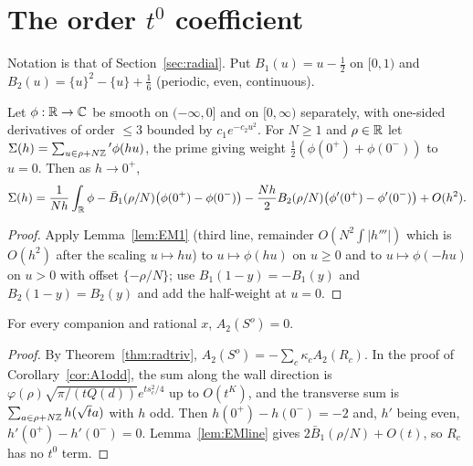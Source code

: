 \section{The order $t^0$ coefficient}\label{sec:order0}
Notation is that of Section~\ref{sec:radial}. Put $B_1(u)=u-\frac12$ on $[0,1)$ and $B_2(u)=\{u\}^2-\{u\}+\frac16$ (periodic, even, continuous).

\begin{lemma}\label{lem:EMline}
Let $\phi:\mathbb{R}\to\mathbb{C}$ be smooth on $(-\infty,0]$ and on $[0,\infty)$ separately, with one-sided derivatives of order $\le3$ bounded by $c_1e^{-c_2u^2}$. For $N\ge1$ and
$\rho\in\mathbb{R}$ let $\Sigma(h)=\sum_{u\in\rho+N\mathbb{Z}}{}'\phi(hu)$, the prime giving weight $\frac12(\phi(0^+)+\phi(0^-))$ to $u=0$. Then as $h\to0^+$,
\[ \Sigma(h)=\frac1{Nh}\int_{\mathbb{R}}\phi-\bar B_1(\rho/N)\big(\phi(0^+)-\phi(0^-)\big)-\frac{Nh}2B_2(\rho/N)\big(\phi'(0^+)-\phi'(0^-)\big)+O(h^2). \]
\end{lemma}
\begin{proof}
Apply Lemma~\ref{lem:EM1} (third line, remainder $O(N^2\int|h'''|)$ which is $O(h^2)$ after the scaling $u\mapsto hu$) to $u\mapsto\phi(hu)$ on $u\ge0$ and to
$u\mapsto\phi(-hu)$ on $u>0$ with offset $\{-\rho/N\}$; use $B_1(1-y)=-B_1(y)$ and $B_2(1-y)=B_2(y)$ and add the half-weight at $u=0$.
\end{proof}

\begin{theorem}\label{thm:A2odd}
For every companion and rational $x$, $A_2(S^o)=0$.
\end{theorem}
\begin{proof}
By Theorem~\ref{thm:radtriv}, $A_2(S^o)=-\sum_c\kappa_cA_2(R_c)$. In the proof of Corollary~\ref{cor:A1odd}, the sum along the wall direction is
$\varphi(\rho)\sqrt{\pi/(tQ(d))}e^{ts_c^2/4}$ up to $O(t^K)$, and the transverse sum is $\sum_{a\in\rho+N\mathbb{Z}}h(\sqrt ta)$ with $h$ odd. Then $h(0^+)-h(0^-)=-2$ and,
$h'$ being even, $h'(0^+)-h'(0^-)=0$. Lemma~\ref{lem:EMline} gives $2\bar B_1(\rho/N)+O(t)$, so $R_c$ has no $t^0$ term.
\end{proof}

